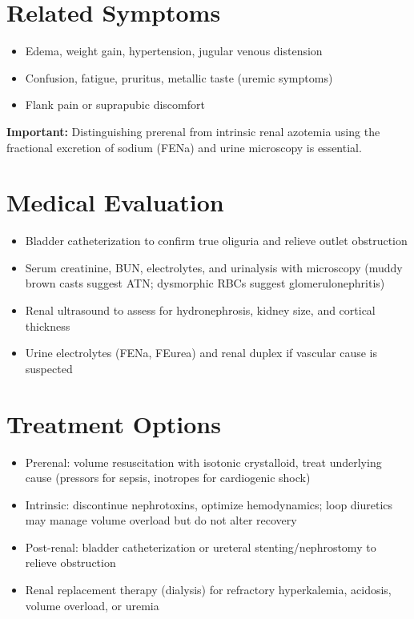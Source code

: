 \section*{Related Symptoms}
\begin{itemize}
  \item Edema, weight gain, hypertension, jugular venous distension
  \item Confusion, fatigue, pruritus, metallic taste (uremic symptoms)
  \item Flank pain or suprapubic discomfort
\end{itemize}
\textbf{Important:} Distinguishing prerenal from intrinsic renal azotemia using the fractional excretion of sodium (FENa) and urine microscopy is essential.

\section*{Medical Evaluation}
\begin{itemize}
  \item Bladder catheterization to confirm true oliguria and relieve outlet obstruction
  \item Serum creatinine, BUN, electrolytes, and urinalysis with microscopy (muddy brown casts suggest ATN; dysmorphic RBCs suggest glomerulonephritis)
  \item Renal ultrasound to assess for hydronephrosis, kidney size, and cortical thickness
  \item Urine electrolytes (FENa, FEurea) and renal duplex if vascular cause is suspected
\end{itemize}

\section*{Treatment Options}
\begin{itemize}
  \item Prerenal: volume resuscitation with isotonic crystalloid, treat underlying cause (pressors for sepsis, inotropes for cardiogenic shock)
  \item Intrinsic: discontinue nephrotoxins, optimize hemodynamics; loop diuretics may manage volume overload but do not alter recovery
  \item Post-renal: bladder catheterization or ureteral stenting/nephrostomy to relieve obstruction
  \item Renal replacement therapy (dialysis) for refractory hyperkalemia, acidosis, volume overload, or uremia
\end{itemize}

